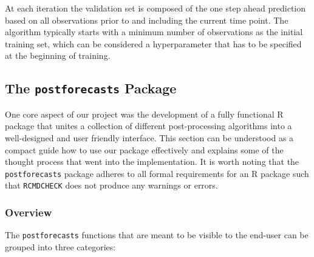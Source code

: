 \documentclass[
]{article}
\begin{document}
At each iteration the validation set is composed of the one step ahead prediction based on all observations prior to and including the current time point.
The algorithm typically starts with a minimum number of observations as the initial training set, which can be considered a hyperparameter that has to be specified at the beginning of training.

\hypertarget{package}{%
\subsection{\texorpdfstring{The \texttt{postforecasts} Package}{The postforecasts Package}}\label{package}}

One core aspect of our project was the development of a fully functional R package that unites a collection of different post-processing algorithms into a well-designed and user friendly interface.
This section can be understood as a compact guide how to use our package effectively and explains some of the thought process that went into the implementation.
It is worth noting that the \texttt{postforecasts} package adheres to all formal requirements for an R package such that \texttt{RCMDCHECK} does not produce any warnings or errors.

\hypertarget{overview}{%
\subsubsection{Overview}\label{overview}}

The \texttt{postforecasts} functions that are meant to be visible to the end-user can be grouped into three categories:
\end{document}
